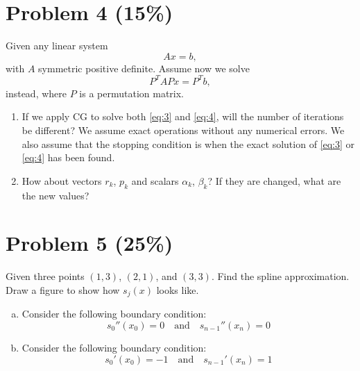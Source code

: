 \documentclass[12pt,a4paper]{article}
\begin{document}
\section*{Problem 4 (15\%)}

Given any linear system
\begin{equation}
Ax = b, \label{eq:3}
\end{equation}
with $A$ symmetric positive definite. Assume now we solve
\begin{equation}
P^T A P x = P^T b, \label{eq:4}
\end{equation}
instead, where $P$ is a permutation matrix.

\begin{enumerate}
    \item If we apply CG to solve both \eqref{eq:3} and \eqref{eq:4}, will the number of iterations be different? We assume exact operations without any numerical errors. We also assume that the stopping condition is when the exact solution of \eqref{eq:3} or \eqref{eq:4} has been found.
    \item How about vectors $r_k$, $p_k$ and scalars $\alpha_k$, $\beta_k$? If they are changed, what are the new values?
\end{enumerate}

\vspace{0.5cm}

\section*{Problem 5 (25\%)}

Given three points $(1,3)$, $(2,1)$, and $(3,3)$. Find the spline approximation. Draw a figure to show how $s_j(x)$ looks like.

\begin{enumerate}[(a)]
    \item Consider the following boundary condition:
    \[
    s_0''(x_0) = 0 \quad \text{and} \quad s_{n-1}''(x_n) = 0
    \]
    \item Consider the following boundary condition:
    \[
    s_0'(x_0) = -1 \quad \text{and} \quad s_{n-1}'(x_n) = 1
    \]
\end{enumerate}
\end{document}
